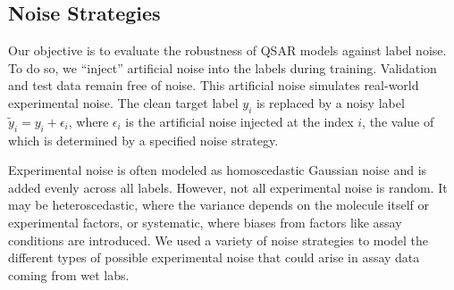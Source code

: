 \documentclass[pdflatex,sn-basic]{sn-jnl}%
\theoremstyle{thmstyleone}%
\theoremstyle{thmstyletwo}%
\theoremstyle{thmstylethree}%
\begin{document}
\subsection{Noise Strategies}
Our objective is to evaluate the robustness of QSAR models against label noise. To do so, we ``inject'' artificial noise into the labels during training. Validation and test data remain free of noise. This artificial noise simulates real-world experimental noise. The clean target label $y_i$ is replaced by a noisy label $\tilde{y}_i = y_i + \epsilon_i$, where $\epsilon_i$ is the artificial noise injected at the index $i$, the value of which is determined by a specified noise strategy.  

Experimental noise is often modeled as homoscedastic Gaussian noise and is added evenly across all labels. However, not all experimental noise is random. It may be heteroscedastic, where the variance depends on the molecule itself or experimental factors, or systematic, where biases from factors like assay conditions are introduced. We used a variety of noise strategies to model the different types of possible experimental noise that could arise in assay data coming from wet labs. 
\end{document}
